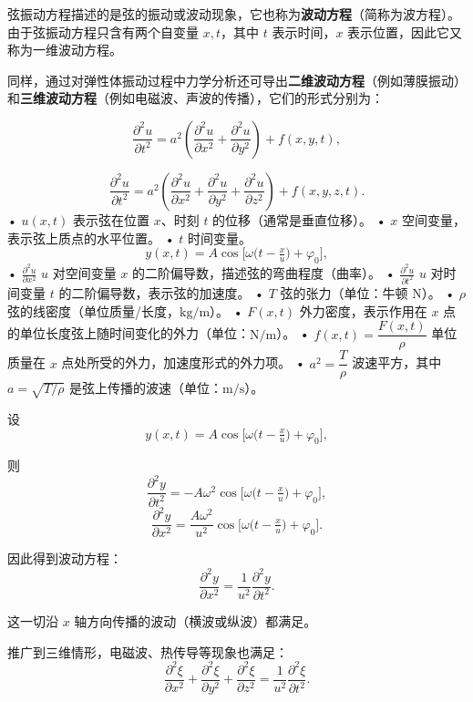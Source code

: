 弦振动方程描述的是弦的振动或波动现象，它也称为\textbf{波动方程}（简称为波方程）。  
由于弦振动方程只含有两个自变量 $x,t$，其中 $t$ 表示时间，$x$ 表示位置，因此它又称为一维波动方程。  

同样，通过对弹性体振动过程中力学分析还可导出\textbf{二维波动方程}（例如薄膜振动）和\textbf{三维波动方程}（例如电磁波、声波的传播），它们的形式分别为：

\begin{equation}
\frac{\partial^2 u}{\partial t^2} 
= a^2 \left( \frac{\partial^2 u}{\partial x^2} + \frac{\partial^2 u}{\partial y^2} \right) 
+ f(x,y,t), 
\tag{1.15}
\end{equation}

\begin{equation}
\frac{\partial^2 u}{\partial t^2} 
= a^2 \left( \frac{\partial^2 u}{\partial x^2} + \frac{\partial^2 u}{\partial y^2} + \frac{\partial^2 u}{\partial z^2} \right) 
+ f(x,y,z,t).
\tag{1.16}
\end{equation}
	•	$u(x,t)$
表示弦在位置 $x$、时刻 $t$ 的位移（通常是垂直位移）。
	•	$x$
空间变量，表示弦上质点的水平位置。
	•	$t$
时间变量。
\[
y(x,t) = A \cos \bigl[\omega \bigl(t - \tfrac{x}{u}\bigr) + \varphi_0 \bigr],
\]
	•	$\frac{\partial^2 u}{\partial x^2}$
$u$ 对空间变量 $x$ 的二阶偏导数，描述弦的弯曲程度（曲率）。
	•	$\frac{\partial^2 u}{\partial t^2}$
$u$ 对时间变量 $t$ 的二阶偏导数，表示弦的加速度。
	•	$T$
弦的张力（单位：牛顿 N）。
	•	$\rho$
弦的线密度（单位质量/长度，$\text{kg}/\text{m}$）。
	•	$F(x,t)$
外力密度，表示作用在 $x$ 点的单位长度弦上随时间变化的外力（单位：$\text{N}/\text{m}$）。
	•	$f(x,t) = \dfrac{F(x,t)}{\rho}$
单位质量在 $x$ 点处所受的外力，加速度形式的外力项。
	•	$a^2 = \dfrac{T}{\rho}$
波速平方，其中 $a = \sqrt{T/\rho}$ 是弦上传播的波速（单位：$\text{m}/\text{s}$）。
\begin{dxtips}[波动方程简单推导]
    设
\[
y(x,t) = A \cos \bigl[\omega \bigl(t - \tfrac{x}{u}\bigr) + \varphi_0 \bigr],
\]

则
\[
\frac{\partial^2 y}{\partial t^2}
= -A\omega^2 \cos \bigl[\omega \bigl(t - \tfrac{x}{u}\bigr) + \varphi_0 \bigr],
\]
\[
\frac{\partial^2 y}{\partial x^2}
= \frac{A\omega^2}{u^2} \cos \bigl[\omega \bigl(t - \tfrac{x}{u}\bigr) + \varphi_0 \bigr].
\]

因此得到波动方程：
\[
\frac{\partial^2 y}{\partial x^2}
= \frac{1}{u^2}\frac{\partial^2 y}{\partial t^2}.
\]

这一切沿 $x$ 轴方向传播的波动（横波或纵波）都满足。

推广到三维情形，电磁波、热传导等现象也满足：
\[
\frac{\partial^2 \xi}{\partial x^2}
+ \frac{\partial^2 \xi}{\partial y^2}
+ \frac{\partial^2 \xi}{\partial z^2}
= \frac{1}{u^2}\frac{\partial^2 \xi}{\partial t^2}.
\]
\end{dxtips}
